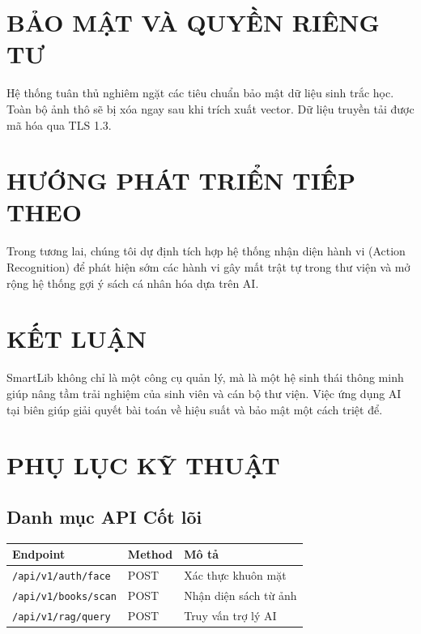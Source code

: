 \documentclass[12pt,a4paper]{article}
\begin{document}
\section{BẢO MẬT VÀ QUYỀN RIÊNG TƯ}
Hệ thống tuân thủ nghiêm ngặt các tiêu chuẩn bảo mật dữ liệu sinh trắc học. Toàn bộ ảnh thô sẽ bị xóa ngay sau khi trích xuất vector. Dữ liệu truyền tải được mã hóa qua TLS 1.3.

\section{HƯỚNG PHÁT TRIỂN TIẾP THEO}
Trong tương lai, chúng tôi dự định tích hợp hệ thống nhận diện hành vi (Action Recognition) để phát hiện sớm các hành vi gây mất trật tự trong thư viện và mở rộng hệ thống gợi ý sách cá nhân hóa dựa trên AI.

\section{KẾT LUẬN}
SmartLib không chỉ là một công cụ quản lý, mà là một hệ sinh thái thông minh giúp nâng tầm trải nghiệm của sinh viên và cán bộ thư viện. Việc ứng dụng AI tại biên giúp giải quyết bài toán về hiệu suất và bảo mật một cách triệt để.

\appendix
\section{PHỤ LỤC KỸ THUẬT}

\subsection{Danh mục API Cốt lõi}
\begin{table}[H]
    \centering
    \small
    \begin{tabularx}{\textwidth}{llX}
        \toprule
        \textbf{Endpoint} & \textbf{Method} & \textbf{Mô tả} \\
        \midrule
        \texttt{/api/v1/auth/face} & POST & Xác thực khuôn mặt \\
        \texttt{/api/v1/books/scan} & POST & Nhận diện sách từ ảnh \\
        \texttt{/api/v1/rag/query} & POST & Truy vấn trợ lý AI \\
        \bottomrule
    \end{tabularx}
\end{table}
\end{document}

